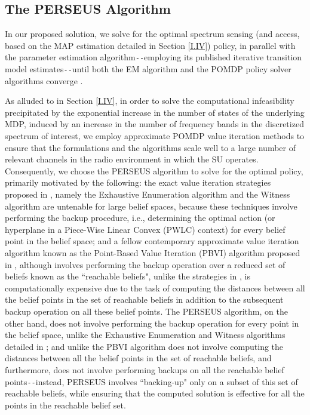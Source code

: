 \subsection{The PERSEUS Algorithm}\label{II.II}
In our proposed solution, we solve for the optimal spectrum sensing (and access, based on the MAP estimation detailed in Section \ref{I.IV}) policy, in parallel with the parameter estimation algorithm\texttt{-{}-}employing its published iterative transition model estimates\texttt{-{}-}until both the EM algorithm and the POMDP policy solver algorithms converge \cite{WCL:paper}.

As alluded to in Section \ref{I.IV}, in order to solve the computational infeasibility precipitated by the exponential increase in the number of states of the underlying MDP, induced by an increase in the number of frequency bands in the discretized spectrum of interest, we employ approximate POMDP value iteration methods to ensure that the formulations and the algorithms scale well to a large number of relevant channels in the radio environment in which the SU operates. Consequently, we choose the PERSEUS algorithm \cite{WCL:13} to solve for the optimal policy, primarily motivated by the following: the exact value iteration strategies proposed in \cite{PUOccupancy:18}, namely the Exhaustive Enumeration algorithm and the Witness algorithm are untenable for large belief spaces, because these techniques involve performing the backup procedure, i.e., determining the optimal action (or hyperplane in a Piece-Wise Linear Convex (PWLC) context) for every belief point in the belief space; and a fellow contemporary approximate value iteration algorithm known as the Point-Based Value Iteration (PBVI) algorithm proposed in \cite{PUOccupancy:17}, although involves performing the backup operation over a reduced set of beliefs known as the ``reachable beliefs", unlike the strategies in \cite{PUOccupancy:17}, is computationally expensive due to the task of computing the distances between all the belief points in the set of reachable beliefs in addition to the subsequent backup operation on all these belief points. The PERSEUS algorithm, on the other hand, does not involve performing the backup operation for every point in the belief space, unlike the Exhaustive Enumeration and Witness algorithms detailed in \cite{PUOccupancy:18}; and unlike the PBVI algorithm \cite{PUOccupancy:17} does not involve computing the distances between all the belief points in the set of reachable beliefs, and furthermore, does not involve performing backups on all the reachable belief points\texttt{-{}-}instead, PERSEUS involves ``backing-up" only on a subset of this set of reachable beliefs, while ensuring that the computed solution is effective for all the points in the reachable belief set.

